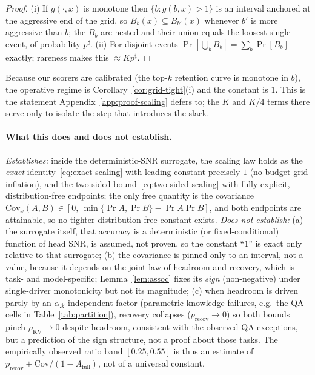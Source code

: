 \begin{proof}
(i) If $g(\cdot,x)$ is monotone then $\{b:g(b,x)>1\}$ is an interval anchored at
the aggressive end of the grid, so $B_{b}(x)\subseteq B_{b'}(x)$ whenever
$b'$ is more aggressive than $b$; the $B_b$ are nested and their union equals
the loosest single event, of probability $p^\sharp$. (ii) For disjoint events
$\Pr[\bigcup_b B_b]=\sum_b\Pr[B_b]$ exactly; rareness makes this
$\approx Kp^\sharp$.
\end{proof}

Because our scorers are calibrated (the top-$k$ retention curve is monotone in
$b$), the operative regime is Corollary~\ref{cor:grid-tight}(i) and the
constant is $1$. This is the statement Appendix~\ref{app:proof-scaling} defers
to; the $K$ and $K/4$ terms there serve only to isolate the step that
introduces the slack.

\paragraph{What this does and does not establish.}
\emph{Establishes:} inside the deterministic-SNR surrogate, the scaling law
holds as the \emph{exact} identity~\eqref{eq:exact-scaling} with leading
constant precisely $1$ (no budget-grid inflation), and the two-sided
bound~\eqref{eq:two-sided-scaling} with fully explicit, distribution-free
endpoints; the only free quantity is the covariance
$\mathrm{Cov}_x(A,B)\in[0,\ \min\{\Pr A,\Pr B\}-\Pr A\Pr B]$, and both endpoints
are attainable, so no tighter distribution-free constant exists.
\emph{Does not establish:} (a) the surrogate itself, that accuracy is a
deterministic (or fixed-conditional) function of head SNR, is assumed, not
proven, so the constant ``$1$'' is exact only relative to that surrogate; (b)
the covariance is pinned only to an interval, not a value, because it depends on
the joint law of headroom and recovery, which is task- and model-specific;
Lemma~\ref{lem:assoc} fixes its \emph{sign} (non-negative) under single-driver
monotonicity but not its magnitude; (c) when headroom is driven partly by an
$\alpha_{\mathcal{R}}$-independent factor (parametric-knowledge failures, e.g.\
the QA cells in Table~\ref{tab:partition}), recovery collapses
($p_{\mathrm{recov}}\!\to\!0$) so both bounds pinch $\rho_{\mathrm{KV}}\!\to\!0$
despite headroom, consistent with the observed QA exceptions, but a prediction
of the sign structure, not a proof about those tasks. The empirically observed
ratio band $[0.25,0.55]$ is thus an estimate of
$p_{\mathrm{recov}}+\mathrm{Cov}/(1-A_{\mathrm{full}})$, not of a universal
constant.

